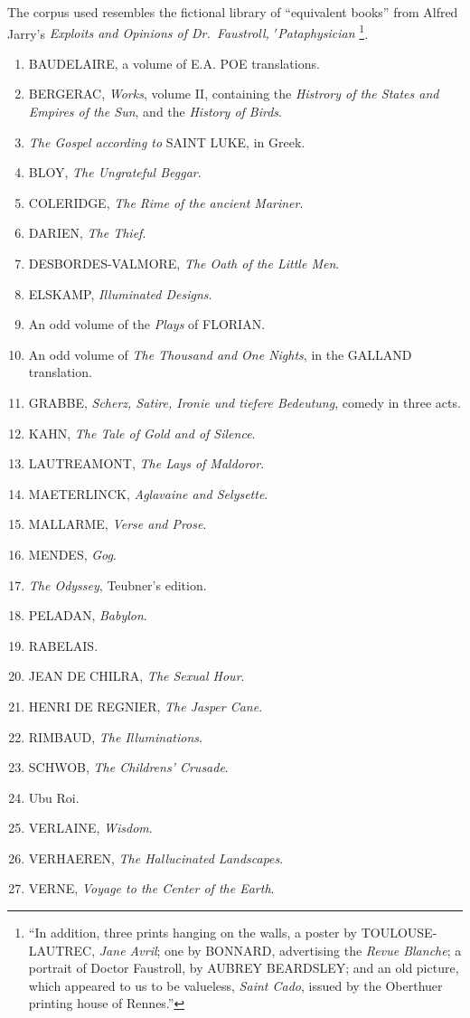 The corpus used resembles the fictional library of ``equivalent books'' from Alfred Jarry's \emph{Exploits and Opinions of Dr.\ Faustroll, $'$Pataphysician} \citeyear[p.10-12]{Jarry1996}\footnote{``In addition, three prints hanging on the walls, a poster by TOULOUSE-LAUTREC, \emph{Jane Avril}; one by BONNARD, advertising the \emph{Revue Blanche}; a portrait of Doctor Faustroll, by AUBREY BEARDSLEY\@; and an old picture, which appeared to us to be valueless, \emph{Saint Cado}, issued by the Oberthuer printing house of Rennes.''\parencite[p.12]{Jarry1996}}.

\begin{enumerate}
\item BAUDELAIRE, a volume of E.A. POE translations.
\item BERGERAC, \emph{Works}, volume II, containing the \emph{Histrory of the States and Empires of the Sun}, and the \emph{History of Birds}.
\item \emph{The Gospel according to} SAINT LUKE, in Greek.
\item BLOY, \emph{The Ungrateful Beggar}.
\item COLERIDGE, \emph{The Rime of the ancient Mariner}.
\item DARIEN, \emph{The Thief}.
\item DESBORDES-VALMORE, \emph{The Oath of the Little Men}.
\item ELSKAMP, \emph{Illuminated Designs}.
\item An odd volume of the \emph{Plays} of FLORIAN\@.
\item An odd volume of \emph{The Thousand and One Nights}, in the GALLAND translation.
\item GRABBE, \emph{Scherz, Satire, Ironie und tiefere Bedeutung}, comedy in three acts.
\item KAHN, \emph{The Tale of Gold and of Silence}.
\item LAUTREAMONT, \emph{The Lays of Maldoror}.
\item MAETERLINCK, \emph{Aglavaine and Selysette}.
\item MALLARME, \emph{Verse and Prose}.
\item MENDES, \emph{Gog}.
\item \emph{The Odyssey}, Teubner's edition.
\item PELADAN, \emph{Babylon}.
\item RABELAIS\@.
\item JEAN DE CHILRA, \emph{The Sexual Hour}.
\item HENRI DE REGNIER, \emph{The Jasper Cane}.
\item RIMBAUD, \emph{The Illuminations}.
\item SCHWOB, \emph{The Childrens' Crusade}.
\item Ubu Roi.
\item VERLAINE, \emph{Wisdom}.
\item VERHAEREN, \emph{The Hallucinated Landscapes}.
\item VERNE, \emph{Voyage to the Center of the Earth}.
\end{enumerate}

